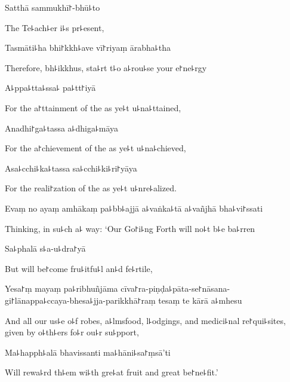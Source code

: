 Satthā sammukhī꜓-bhū꜕to

\begin{english}
  The Te꜕ach꜕er i꜕s pr꜕esent,
\end{english}

Tasmāti꜕ha bhi꜓kkh꜕ave vī꜓riyaṃ ārabha꜕tha

\begin{english}
  Therefore, bh꜕ikkhus, sta꜕rt t꜕o a꜕rou꜕se your e꜓ne꜕rgy
\end{english}

A꜕ppa꜕tta꜕ssa꜕ pa꜕tt꜓iyā

\begin{english}
  For the a꜓ttainment of the as ye꜕t u꜕na꜕ttained,
\end{english}

\ifaivedition
\clearpage
\fi

Anadhi꜓ga꜕tassa a꜕dhiga꜕māya

\begin{english}
  For the a꜓chievement of the as ye꜕t u꜕na꜕chieved,
\end{english}

Asa꜕cchi꜕ka꜕tassa sa꜕cchi꜕ki꜕ri꜓yāya

\begin{english}
  For the reali꜓zation of the as ye꜕t u꜕nre꜕alized.
\end{english}

Evaṃ no ayaṃ amhākaṃ pa꜕bb꜕ajjā a꜕vaṅka꜕tā a꜕vañjhā bha꜕vi꜓ssati

\begin{english}
  Thinking, in su꜕ch a꜕ way: `Our Go꜓i꜕ng Forth will no꜕t b꜕e ba꜕rren
\end{english}

Sa꜕phalā s꜕a-u꜕dra꜓yā

\begin{english}
  But will be꜓come fru꜕itfu꜕l an꜕d fe꜕rtile,
\end{english}

Yesa꜓ṃ mayaṃ pa꜕ribhuñjāma cīva꜓ra-piṇḍa꜕pāta-se꜓nāsana-\\
gi꜓lānappa꜕ccaya-bhesa꜕jja-parikkhā꜓raṃ tesaṃ te kārā a꜕mhesu

\begin{english}
  And all our us꜕e o꜕f robes, a꜕lmsfood, l꜕odgings, and medici꜕nal
  re꜓qui꜕sites, given by o꜕th꜕ers fo꜕r ou꜕r su꜕pport,
\end{english}

Ma꜕happh꜕alā bhavissanti ma꜕hāni꜕sa꜓ṃsā'ti

\begin{english}
  Will rewa꜕rd th꜕em wi꜕th gre꜕at fruit and great be꜓ne꜕fit.'
\end{english}

